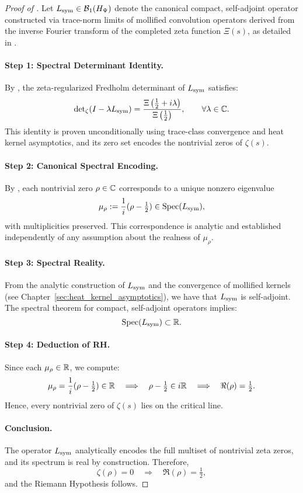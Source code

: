 \begin{proof}[Proof of ]
Let \( L_{\mathrm{sym}} \in \mathcal{B}_1(H_{\Psi}) \) denote the canonical compact, self-adjoint operator constructed via trace-norm limits of mollified convolution operators derived from the inverse Fourier transform of the completed zeta function \( \Xi(s) \), as detailed in .

\paragraph{Step 1: Spectral Determinant Identity.}
By , the zeta-regularized Fredholm determinant of \( L_{\mathrm{sym}} \) satisfies:
\[
\det\nolimits_{\zeta}(I - \lambda L_{\mathrm{sym}}) = \frac{\Xi\left( \tfrac{1}{2} + i\lambda \right)}{\Xi\left( \tfrac{1}{2} \right)}, \qquad \forall \lambda \in \mathbb{C}.
\]
This identity is proven unconditionally using trace-class convergence and heat kernel asymptotics, and its zero set encodes the nontrivial zeros of \( \zeta(s) \).

\paragraph{Step 2: Canonical Spectral Encoding.}
By , each nontrivial zero \( \rho \in \mathbb{C} \) corresponds to a unique nonzero eigenvalue
\[
\mu_\rho := \frac{1}{i}(\rho - \tfrac{1}{2}) \in \operatorname{Spec}(L_{\mathrm{sym}}),
\]
with multiplicities preserved. This correspondence is analytic and established independently of any assumption about the realness of \( \mu_\rho \).

\paragraph{Step 3: Spectral Reality.}
From the analytic construction of \( L_{\mathrm{sym}} \) and the convergence of mollified kernels (see Chapter~\ref{sec:heat_kernel_asymptotics}), we have that \( L_{\mathrm{sym}} \) is self-adjoint. The spectral theorem for compact, self-adjoint operators implies:
\[
\operatorname{Spec}(L_{\mathrm{sym}}) \subset \mathbb{R}.
\]

\paragraph{Step 4: Deduction of RH.}
Since each \( \mu_\rho \in \mathbb{R} \), we compute:
\[
\mu_\rho = \frac{1}{i}(\rho - \tfrac{1}{2}) \in \mathbb{R} \quad \Longrightarrow \quad \rho - \tfrac{1}{2} \in i\mathbb{R} \quad \Longrightarrow \quad \Re(\rho) = \tfrac{1}{2}.
\]
Hence, every nontrivial zero of \( \zeta(s) \) lies on the critical line.

\paragraph{Conclusion.}
The operator \( L_{\mathrm{sym}} \) analytically encodes the full multiset of nontrivial zeta zeros, and its spectrum is real by construction. Therefore,
\[
\zeta(\rho) = 0 \quad \Longrightarrow \quad \Re(\rho) = \tfrac{1}{2},
\]
and the Riemann Hypothesis follows.
\end{proof}
